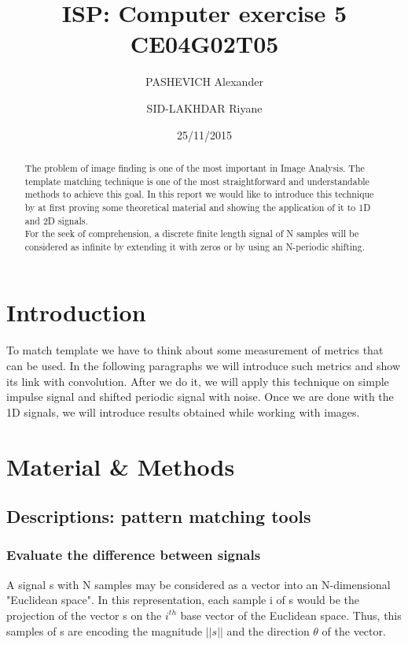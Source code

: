 \documentclass[a4paper]{article}
\title{ISP: Computer exercise 5\\CE04G02T05}
\author{PASHEVICH Alexander \and SID-LAKHDAR Riyane}
\date{25/11/2015}
\begin{document}


\maketitle


\begin{abstract}
The problem of image finding is one of the most important in Image Analysis. The template matching technique is one of the most straightforward and understandable methods to achieve this goal. In this report we would like to introduce this technique by at first proving some theoretical material and showing the application of it to 1D and 2D signals.\\
For the seek of comprehension, a discrete finite length signal of N samples will be considered as infinite by extending it with zeros or by using an N-periodic shifting.
\end{abstract}




\section{Introduction}
To match template we have to think about some measurement of metrics that can be used. In the following paragraphs we will introduce such metrics and show its link with convolution. After we do it, we will apply this technique on simple impulse signal and shifted periodic signal with noise. Once we are done with the 1D signals, we will introduce results obtained while working with images.



\section{Material \& Methods}
    \subsection{Descriptions: pattern matching tools}
        \subsubsection{Evaluate the difference between signals}
A signal s with N samples may be considered as a vector into an N-dimensional "Euclidean space".   In this representation, each sample i of s would be the projection of the vector s on the $i^{th}$ base vector of the Euclidean space.   Thus, this samples of s are encoding the magnitude $||s||$ and the direction $\theta$ of the vector.\\
\end{document}
